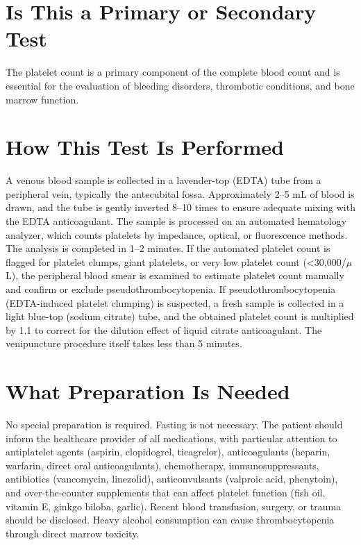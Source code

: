 \section*{Is This a Primary or Secondary Test}
The platelet count is a primary component of the complete blood count and is essential for the evaluation of bleeding disorders, thrombotic conditions, and bone marrow function.

\section*{How This Test Is Performed}
A venous blood sample is collected in a lavender-top (EDTA) tube from a peripheral vein, typically the antecubital fossa. Approximately 2--5 mL of blood is drawn, and the tube is gently inverted 8--10 times to ensure adequate mixing with the EDTA anticoagulant. The sample is processed on an automated hematology analyzer, which counts platelets by impedance, optical, or fluorescence methods. The analysis is completed in 1--2 minutes. If the automated platelet count is flagged for platelet clumps, giant platelets, or very low platelet count (<30,000/$\mu$L), the peripheral blood smear is examined to estimate platelet count manually and confirm or exclude pseudothrombocytopenia. If pseudothrombocytopenia (EDTA-induced platelet clumping) is suspected, a fresh sample is collected in a light blue-top (sodium citrate) tube, and the obtained platelet count is multiplied by 1.1 to correct for the dilution effect of liquid citrate anticoagulant. The venipuncture procedure itself takes less than 5 minutes.

\section*{What Preparation Is Needed}
No special preparation is required. Fasting is not necessary. The patient should inform the healthcare provider of all medications, with particular attention to antiplatelet agents (aspirin, clopidogrel, ticagrelor), anticoagulants (heparin, warfarin, direct oral anticoagulants), chemotherapy, immunosuppressants, antibiotics (vancomycin, linezolid), anticonvulsants (valproic acid, phenytoin), and over-the-counter supplements that can affect platelet function (fish oil, vitamin E, ginkgo biloba, garlic). Recent blood transfusion, surgery, or trauma should be disclosed. Heavy alcohol consumption can cause thrombocytopenia through direct marrow toxicity.

